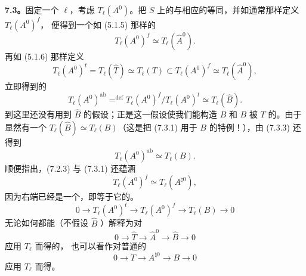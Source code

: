 \textbf{7.3。}固定一个 $\ell$，考虑 $T_\ell(A^0)$。把 $S$ 上的与相应的等同，并如通常那样定义 $T_\ell(A^0)^f$，
便得到一个如 (5.1.5) 那样的
\begin{equation}\tag{7.3.1}
 T_\ell(A^0)^f\simeq T_\ell(\widehat A^0).
\end{equation}
再如 (5.1.6) 那样定义
\begin{equation}\tag{7.3.2}
 T_\ell(A^0)^t=T_\ell(\widehat T)\simeq T_\ell(T)
 \subset T_\ell(A^0)^f\simeq T_\ell(\widehat A^0),
\end{equation}
立即得到的
\begin{equation}\tag{7.3.3}
 T_\ell(A^0)^{\mathrm{ab}}\mathrel{\mathop=^{\mathrm{def}}}
 T_\ell(A^0)^f/T_\ell(A^0)^t\simeq T_\ell(\widehat B).
\end{equation}
到这里还没有用到 $\widehat B$ 的假设；正是这一假设使我们能构造 $B$ 和 $B$ 被 $T$ 的。由于显然有一个 $T_\ell(\widehat B)\simeq T_\ell(B)$（这是把 (7.3.1) 用于 $B$ 的特例！），由 (7.3.3) 还得到
\begin{equation}\tag{7.3.4}
 T_\ell(A^0)^{\mathrm{ab}}\simeq T_\ell(B).
\end{equation}
顺便指出，(7.2.3) 与 (7.3.1) 还蕴涵
\begin{equation}\tag{7.3.5}
 T_\ell(A^0)^f\simeq T_\ell(A^{\natural0}),
\end{equation}
因为右端已经是一个，即等于它的。
\begin{equation}\tag{7.3.6}
 0\longrightarrow T_\ell(A^0)^t\longrightarrow T_\ell(A^0)^f
 \longrightarrow T_\ell(B)\longrightarrow0
\end{equation}
无论如何都能（不假设 $\widehat B$ ）解释为对
\[
 0\longrightarrow\widehat T\longrightarrow\widehat A^0
 \longrightarrow\widehat B\longrightarrow0
\]
应用 $T_\ell$ 而得的，
也可以看作对普通的
\[
 0\longrightarrow T\longrightarrow A^{\natural0}\longrightarrow B\longrightarrow0
\]
应用 $T_\ell$ 而得。

